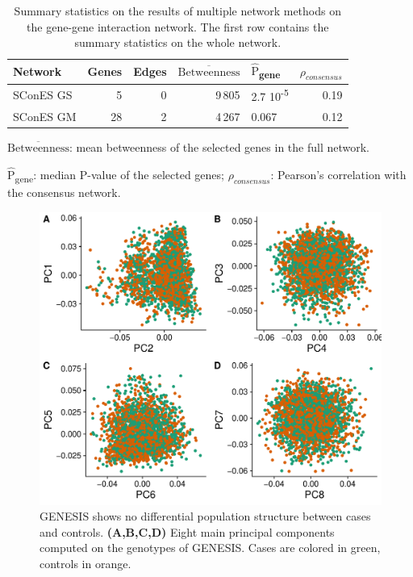 \documentclass[twocolumn, 11pt, draft]{article}
\newcommand{\mean}[1]{$\overline{\mbox{#1}}$}
\newcommand{\median}[1]{$\hat{\mbox{#1}}$}
\begin{document}
\begin{table}[htbp]
\begin{threeparttable}
  \caption{\label{tab:scones_gene_solutions}
Summary statistics on the results of multiple network methods on the gene-gene interaction network. The first row contains the summary statistics on the whole network.}
\centering
\begin{tabular}{lrrrlr}
Network & Genes & Edges & \mean{Betweenness} & \median{P}\textsubscript{gene} & $\rho_{consensus}$\\
\hline
SConES GS & 5 & 0 & 9\,805 & 2.7 \texttimes{} 10\textsuperscript{-5} & 0.19\\
SConES GM & 28 & 2 & 4\,267 & 0.067 & 0.12\\
\end{tabular}
\begin{tablenotes}
\item \mean{Betweenness}: mean betweenness of the selected genes in the full network.
\item \median{P}\textsubscript{gene}: median P-value of the selected genes; $\rho_{consensus}$: Pearson's correlation with the consensus network.
\end{tablenotes}
\end{threeparttable}
\end{table}

\begin{figure}[htbp]
\centering
\includegraphics[width=.9\linewidth]{./figures/sfigure_1.pdf}
\caption{\label{sfig:pcs} GENESIS shows no differential population structure between cases and controls. \textbf{(A,B,C,D)} Eight main principal components computed on the genotypes of GENESIS. Cases are colored in green, controls in orange.}
\end{figure}
\end{document}

